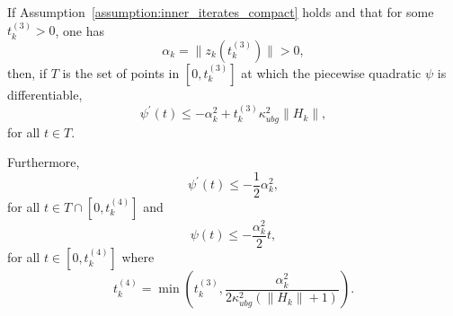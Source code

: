 \begin{lemma}\label{lemma:bound_model_proj_grad_path}
	If Assumption~\ref{assumption:inner_iterates_compact} holds and that for some $t_k^{(3)}>0 $, one has
	\[\alpha_k = \|z_k(t_k^{(3)})\| > 0,\]
	then, if $T$ is the set of points in $[0,t_k^{(3)}]$ at which the piecewise quadratic $\psi$ is differentiable, 
	\begin{equation}\label{eq:lemma_ineq_model_derivative_t3}
		\psi^\prime(t) \le -\alpha_k^2 + t_k^{(3)}\kappa_{ubg}^2\|H_k\|,
	\end{equation}
	for all $t\in T$.
	
	Furthermore, 
	\begin{equation*}
		\psi^\prime(t) \le -\dfrac{1}{2}\alpha_k^2 ,
	\end{equation*}
	for all $t\in T \cap [0,t_k^{(4)}]$ and 
	\begin{equation*}
		\psi(t) \le  - \dfrac{\alpha_k^2}{2}t,
	\end{equation*}
	for all $t\in  [0,t_k^{(4)}]$ where 
	\begin{equation}\label{eq:t4_def}
		t_k^{(4)} = \min \left(t_k^{(3)}, \dfrac{\alpha_k^2}{2\kappa_{ubg}^2(\|H_k\|+1)}\right).
	\end{equation}
\end{lemma}

